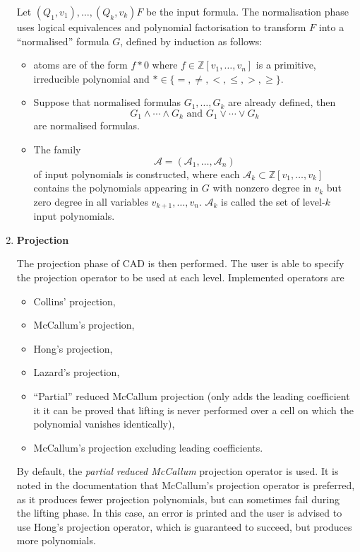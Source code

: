 \documentclass[
]{book}
\providecommand{\tightlist}{%
  \setlength{\itemsep}{0pt}\setlength{\parskip}{0pt}}
\theoremstyle{definition}
\theoremstyle{definition}
\theoremstyle{definition}
\theoremstyle{definition}
\theoremstyle{remark}
\begin{document}
\begin{enumerate}
  Let \((Q_1,v_1),\ldots,(Q_k,v_k) F\) be the input formula. The normalisation phase uses logical equivalences and polynomial factorisation to transform \(F\) into a ``normalised'' formula \(G\), defined by induction as follows:

  \begin{itemize}
  \tightlist
  \item
    atoms are of the form \(f \ast 0\) where \(f \in \mathbb{Z}[v_1,\ldots,v_n]\) is a primitive, irreducible polynomial and \(\ast \in \{=, \ne, <, \le, >, \ge \}\).
  \item
    Suppose that normalised formulas \(G_1,\ldots,G_k\) are already defined, then
    \[
     G_1 \land \cdots \land G_k \text{ and } G_1 \lor \cdots \lor G_k
     \]
    are normalised formulas.
  \item
    The family
    \[
     \mathcal{A} = (\mathcal{A}_1, \ldots,\mathcal{A}_n)
     \] of input polynomials is constructed, where each \(\mathcal{A}_k \subset \mathbb{Z}[v_1,\ldots,v_k]\) contains the polynomials appearing in \(G\) with nonzero degree in \(v_k\) but zero degree in all variables \(v_{k+1},\ldots,v_n\).
    \(\mathcal{A}_k\) is called the set of level-\(k\) input polynomials.
  \end{itemize}
\item
  \textbf{Projection}

  The projection phase of CAD is then performed. The user is able to specify the projection operator to be used at each level. Implemented operators are

  \begin{itemize}
  \tightlist
  \item
    Collins' projection,
  \item
    McCallum's projection,
  \item
    Hong's projection,
  \item
    Lazard's projection,
  \item
    ``Partial'' reduced McCallum projection
    (only adds the leading coefficient it it can be proved that lifting is never performed over a cell on which the polynomial vanishes identically),
  \item
    McCallum's projection excluding leading coefficients.
  \end{itemize}

  By default, the \emph{partial reduced McCallum} projection operator is used. It is noted in the documentation that McCallum's projection operator is preferred, as it produces fewer projection polynomials, but can sometimes fail during the lifting phase. In this case, an error is printed and the user is advised to use Hong's projection operator, which is guaranteed to succeed, but produces more polynomials.


\end{enumerate}
\end{document}
